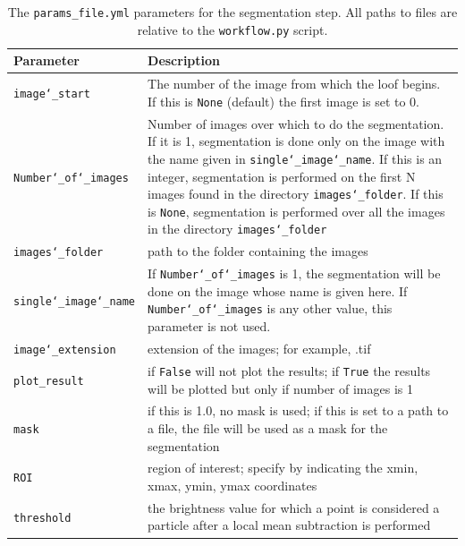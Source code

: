 \documentclass[10pt,a4paper]{article}
\begin{document}
\begin{table}[!ht]
	\centering
	\caption{The \texttt{params\_file.yml} parameters for the segmentation step. All paths to files are relative to the \texttt{workflow.py} script. \label{tab:segment_params}}
	\begin{tabular}{l m{10cm}}
		\hline
		Parameter & Description\\
		\hline
		
		\texttt{image\char`_start} & The number of the image from which the loof begins. If this is \texttt{None} (default) the first image is set to 0.\\[.3em]
		
		\texttt{Number\char`_of\char`_images} & Number of images over which to do the segmentation. If it is 1, segmentation is done only on the image with the name given in \texttt{single\char`_image\char`_name}. If this is an integer, segmentation is performed on the first N images found in the directory \texttt{images\char`_folder}. If this is \texttt{None}, segmentation is performed over all the images in the directory \texttt{images\char`_folder} \\[.3em]
		
		\texttt{images\char`_folder} & path to the folder containing the images\\[.3em]
		
		\texttt{single\char`_image\char`_name} & If \texttt{Number\char`_of\char`_images} is 1, the segmentation will be done on the image whose name is given here. If \texttt{Number\char`_of\char`_images} is any other value, this parameter is not used. \\[.3em]
		
		\texttt{image\char`_extension} & extension of the images; for example, .tif\\[.3em]
		

		\texttt{plot\_result} & if \texttt{False} will not plot the results; if \texttt{True} the results will be plotted but only if number of images is 1 \\[.3em]
		
		\texttt{mask} & if this is 1.0, no mask is used; if this is set to a path to a file, the file will be used as a mask for the segmentation \\[.3em]

		
		\texttt{ROI} & region of interest; specify by indicating the xmin, xmax, ymin, ymax coordinates \\[.3em]
		
		\texttt{threshold} & the brightness value for which a point is considered a particle after a local mean subtraction is performed \\[.3em]
		

\end{tabular}
\end{table}
\end{document}
